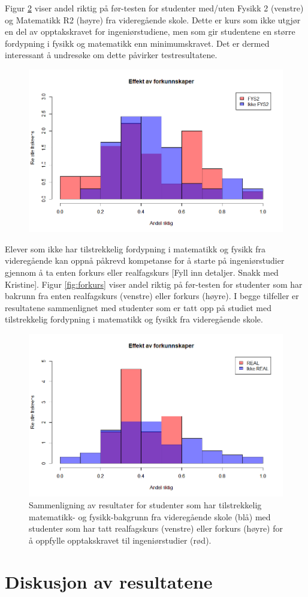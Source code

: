 \documentclass[a4paper,norsk,12pt]{report}
\begin{document}
Figur \ref{fig:fysmat} viser andel riktig på før-testen for studenter med/uten Fysikk 2 (venstre) og Matematikk R2 (høyre) fra videregående skole. Dette er kurs som ikke utgjør en del av opptakskravet for ingeniørstudiene, men som gir studentene en større fordypning i fysikk og matematikk enn minimumskravet. Det er dermed interessant å undresøke om dette påvirker testresultatene.
\begin{figure}[p]
	\includegraphics[width=.48\textwidth]{./fys2}
	\caption{}
	\label{fig:fysmat}
\end{figure}
Elever som ikke har tilstrekkelig fordypning i matematikk og fysikk fra videregående kan oppnå påkrevd kompetanse for å starte på ingeniørstudier gjennom å ta enten forkurs eller realfagskurs {\color{red}[Fyll inn detaljer. Snakk med Kristine]}. Figur \ref{fig:forkurs} viser andel riktig på før-testen for studenter som har bakrunn fra enten realfagskurs (venstre) eller forkurs (høyre). I begge tilfeller er resultatene sammenlignet med studenter som er tatt opp på studiet med tilstrekkelig fordypning i matematikk og fysikk fra videregående skole.
\begin{figure}[p]
	\includegraphics[width=.48\textwidth]{./real}
	\caption{ Sammenligning av resultater for studenter som har tilstrekkelig matematikk- og fysikk-bakgrunn fra videregående skole (blå) med studenter som har tatt realfagskurs (venstre) eller forkurs (høyre) for å oppfylle opptakskravet til ingeniørstudier (rød).}
	\label{fig:fysmat}
\end{figure}




\chapter{Diskusjon av resultatene}
\end{document}
